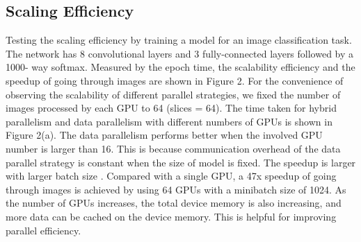 \documentclass[12pt,letterpaper, onecolumn]{exam}
\begin{document}
    \subsection{Scaling Efficiency}
    Testing the scaling efficiency by training a model for an image classification task. The network has 8 convolutional layers and 3 fully-connected layers followed by a 1000- way softmax. Measured by the epoch time, the scalability efficiency and the speedup of going through images are shown in Figure 2. For the convenience of observing the scalability of different parallel strategies, we fixed the number of images processed by each GPU to 64 (slices = 64). The time taken for hybrid parallelism and data parallelism with different numbers of GPUs is shown in Figure 2(a). The data parallelism performs better when the involved GPU number is larger than 16. This is because communication overhead of the data parallel strategy is constant when the size of model is fixed. The speedup is larger with larger batch size . Compared with a single GPU, a 47x speedup of going through images is achieved by using 64 GPUs with a minibatch size of 1024. As the number of GPUs increases, the total device memory is also increasing, and more data can be cached on the device memory. This is helpful for improving parallel efficiency.

    
\end{document}
